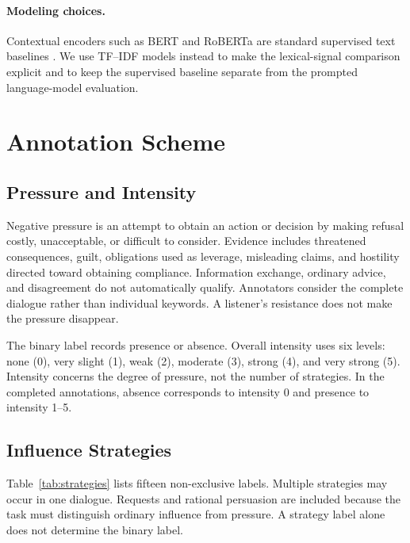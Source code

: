 \documentclass[11pt]{article}
\begin{document}
\paragraph{Modeling choices.}
Contextual encoders such as BERT and RoBERTa are standard supervised text
baselines \citep{devlin2019,liu2019}. We use TF--IDF models instead to make
the lexical-signal comparison explicit and to keep the supervised baseline
separate from the prompted language-model evaluation.

\section{Annotation Scheme}
\subsection{Pressure and Intensity}
Negative pressure is an attempt to obtain an action or decision by making
refusal costly, unacceptable, or difficult to consider. Evidence includes
threatened consequences, guilt, obligations used as leverage, misleading
claims, and hostility directed toward obtaining compliance. Information
exchange, ordinary advice, and disagreement do not automatically qualify.
Annotators consider the complete dialogue rather than individual keywords.
A listener's resistance does not make the pressure disappear.

The binary label records presence or absence. Overall intensity uses six
levels: none (0), very slight (1), weak (2), moderate (3), strong (4), and
very strong (5). Intensity concerns the degree of pressure, not the number
of strategies. In the completed annotations, absence corresponds to
intensity 0 and presence to intensity 1--5.

\subsection{Influence Strategies}
Table~\ref{tab:strategies} lists fifteen non-exclusive labels. Multiple
strategies may occur in one dialogue. Requests and rational persuasion are
included because the task must distinguish ordinary influence from pressure.
A strategy label alone does not determine the binary label.
\end{document}
